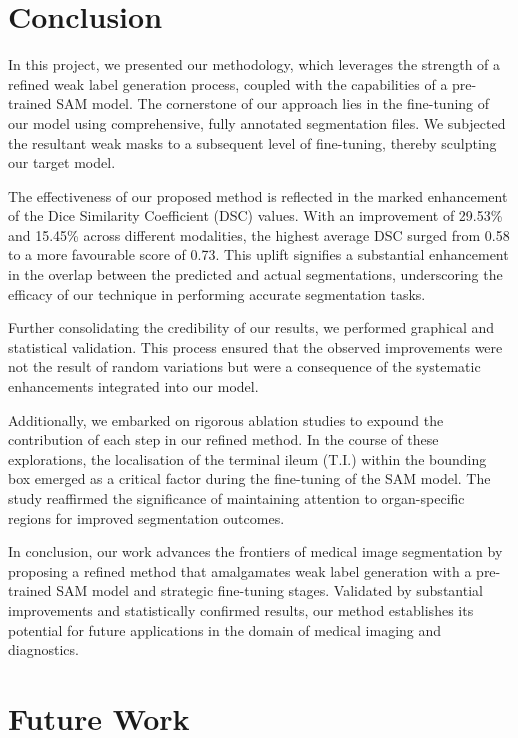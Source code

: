 \section{Conclusion}

In this project, we presented our methodology, which leverages the strength of a refined weak label generation process, coupled with the capabilities of a pre-trained SAM model. The cornerstone of our approach lies in the fine-tuning of our model using comprehensive, fully annotated segmentation files. We subjected the resultant weak masks to a subsequent level of fine-tuning, thereby sculpting our target model.

The effectiveness of our proposed method is reflected in the marked enhancement of the Dice Similarity Coefficient (DSC) values. With an improvement of 29.53\% and 15.45\% across different modalities, the highest average DSC surged from 0.58 to a more favourable score of 0.73. This uplift signifies a substantial enhancement in the overlap between the predicted and actual segmentations, underscoring the efficacy of our technique in performing accurate segmentation tasks.

Further consolidating the credibility of our results, we performed graphical and statistical validation. This process ensured that the observed improvements were not the result of random variations but were a consequence of the systematic enhancements integrated into our model.

Additionally, we embarked on rigorous ablation studies to expound the contribution of each step in our refined method. In the course of these explorations, the localisation of the terminal ileum (T.I.) within the bounding box emerged as a critical factor during the fine-tuning of the SAM model. The study reaffirmed the significance of maintaining attention to organ-specific regions for improved segmentation outcomes.

In conclusion, our work advances the frontiers of medical image segmentation by proposing a refined method that amalgamates weak label generation with a pre-trained SAM model and strategic fine-tuning stages. Validated by substantial improvements and statistically confirmed results, our method establishes its potential for future applications in the domain of medical imaging and diagnostics.

\section{Future Work}

